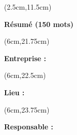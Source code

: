 \begin{titlepage}
    \begin{textblock*}{16cm}(2.5cm,11.5cm)
        \makeatletter
        \noindent
        \normalsize
        \selectfont
        \begin{center}
            \textbf{\textcolor{bleuRoiUTT}{Résumé (150 mots)}}
        \end{center}
        \begin{flushleft}
            \justifying
            \titletext
        \end{flushleft}
        \makeatother
    \end{textblock*}


    \begin{textblock*}{16cm}(6cm,21.75cm)
        \normalsize
        \begin{flushleft}
            \textbf{\textcolor{bleuRoiUTT}{Entreprise :} \theEntreprise}
        \end{flushleft}
    \end{textblock*}

    \begin{textblock*}{16cm}(6cm,22.5cm)
        \normalsize
        \begin{flushleft}
            \textbf{\textcolor{bleuRoiUTT}{Lieu :} \textit{\mapAddr{\theLieu}}}
        \end{flushleft}
    \end{textblock*}

    \begin{textblock*}{16cm}(6cm,23.75cm)
        \normalsize
        \begin{flushleft}
            \textbf{\textcolor{bleuRoiUTT}{Responsable :} \theREntre}
        \end{flushleft}
    \end{textblock*}

\end{titlepage}

\clearpage %
